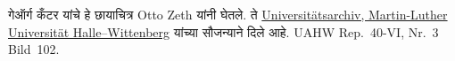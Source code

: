 गेऑर्ग कँटर यांचे हे छायाचित्र Otto Zeth यांनी घेतले. ते
\href{https://www.archiv.uni-halle.de/}{Universitätsarchiv, Martin-Luther
Universität Halle–Wittenberg} यांच्या सौजन्याने दिले आहे. UAHW
Rep.~40-VI, Nr.~3 Bild~102.
